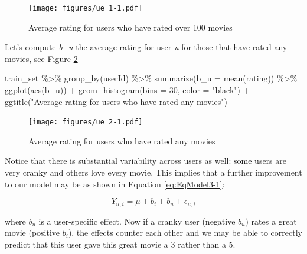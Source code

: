 \documentclass[
]{article}
\newenvironment{Shaded}{}{}
\newcommand{\AttributeTok}[1]{\textcolor[rgb]{0.49,0.56,0.16}{#1}}
\newcommand{\DecValTok}[1]{\textcolor[rgb]{0.25,0.63,0.44}{#1}}
\newcommand{\FunctionTok}[1]{\textcolor[rgb]{0.02,0.16,0.49}{#1}}
\newcommand{\NormalTok}[1]{#1}
\newcommand{\SpecialCharTok}[1]{\textcolor[rgb]{0.25,0.44,0.63}{#1}}
\newcommand{\StringTok}[1]{\textcolor[rgb]{0.25,0.44,0.63}{#1}}
\begin{document}
\begin{figure}
\centering
\texttt{[image: figures/ue\_1-1.pdf]}
\caption{Average rating for users who have rated over 100
movies\label{fig:average_ratings_for_users_who_have_rated_over_100_movies}}
\end{figure}

\newpage

Let's compute \emph{b\_u} the average rating for user \emph{u} for those
that have rated any movies, see Figure
\ref{fig:average_ratings_for_users_who_have_rated_any_movies}

\begin{Shaded}
\begin{Highlighting}[]
\NormalTok{train\_set }\SpecialCharTok{\%\textgreater{}\%} 
  \FunctionTok{group\_by}\NormalTok{(userId) }\SpecialCharTok{\%\textgreater{}\%} 
  \FunctionTok{summarize}\NormalTok{(}\AttributeTok{b\_u =} \FunctionTok{mean}\NormalTok{(rating)) }\SpecialCharTok{\%\textgreater{}\%} 
  \FunctionTok{ggplot}\NormalTok{(}\FunctionTok{aes}\NormalTok{(b\_u)) }\SpecialCharTok{+} 
  \FunctionTok{geom\_histogram}\NormalTok{(}\AttributeTok{bins =} \DecValTok{30}\NormalTok{, }\AttributeTok{color =} \StringTok{"black"}\NormalTok{) }\SpecialCharTok{+} 
  \FunctionTok{ggtitle}\NormalTok{(}\StringTok{"Average rating for users who have rated any movies"}\NormalTok{)}
\end{Highlighting}
\end{Shaded}

\begin{figure}
\centering
\texttt{[image: figures/ue\_2-1.pdf]}
\caption{Average rating for users who have rated any
movies\label{fig:average_ratings_for_users_who_have_rated_any_movies}}
\end{figure}

Notice that there is substantial variability across users as well: some
users are very cranky and others love every movie. This implies that a
further improvement to our model may be as shown in Equation
\ref{eq:EqModel3-1}:

%
\par

\label{eq:EqModel3-1} \begin{equation}
  Y_{u,i} = \mu + b_{i} + b_{u} + \epsilon_{u,i}
\end{equation}

where \(b_{u}\) is a user-specific effect. Now if a cranky user
(negative \(b_{u}\)) rates a great movie (positive \(b_{i}\)), the
effects counter each other and we may be able to correctly predict that
this user gave this great movie a 3 rather than a 5.
\end{document}
